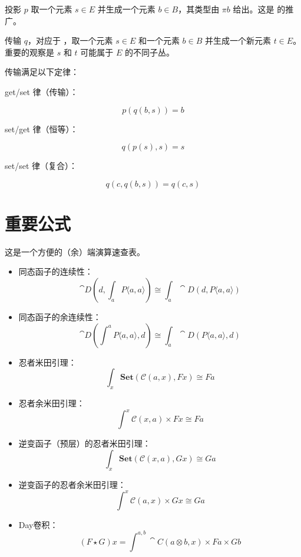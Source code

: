 \documentclass[DaoFP]{subfiles}
\begin{document}
投影 $p$ 取一个元素 $s \in E$ 并生成一个元素 $b \in B$，其类型由 $\pi b$ 给出。这是  的推广。

传输 $q$，对应于 ，取一个元素 $s \in E$ 和一个元素 $b \in B$ 并生成一个新元素 $t \in E$。重要的观察是 $s$ 和 $t$ 可能属于 $E$ 的不同子丛。

传输满足以下定律：

get/set 律（传输）：

\[ p (q (b, s)) = b \]

set/get 律（恒等）：

\[ q ( p (s), s) = s \]

set/set 律（复合）：

\[ q (c, q (b, s)) = q (c, s) \]

\section{重要公式}
这是一个方便的（余）端演算速查表。
\begin{itemize}
\item 同态函子的连续性：
\[\cat D\left(d, \int_a P\langle a, a \rangle \right) \cong \int_a \cat D \left(d, P\langle a, a \rangle \right) \]
\item 同态函子的余连续性：
\[\cat D\left( \int^a P\langle a, a \rangle , d \right) \cong \int_a \cat D \left( P\langle a, a \rangle, d \right) \]
\item 忍者米田引理：
\[ \int_{x} \mathbf{Set} (\mathcal{C}(a, x), F x) \cong F a \]
\item 忍者余米田引理：
\[ \int^{x} \mathcal{C}(x, a) \times F x \cong F a \]
\item 逆变函子（预层）的忍者米田引理：
\[ \int_{x} \mathbf{Set} (\mathcal{C}(x, a), G x) \cong G a \]
\item 逆变函子的忍者余米田引理：
\[ \int^{x} \mathcal{C}(a, x) \times G x \cong G a \]
\item Day卷积：
\[ (F \star G) x = \int^{a, b} \cat C (a \otimes b, x) \times F a \times G b \]

\end{itemize}
\end{document}

